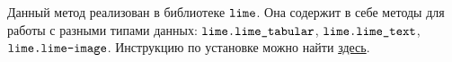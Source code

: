 Данный метод реализован в библиотеке $\verb|lime|$. Она содержит в себе методы для работы с разными типами данных: $\verb|lime.lime_tabular|$, $\verb|lime.lime_text|$, $\verb|lime.lime-image|$. Инструкцию по установке можно найти \href{https://github.com/marcotcr/lime}{здесь}.